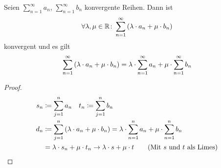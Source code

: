 \begin{satz} %
    Seien $\sum_{n=1}^{\infty} a_n$, $\sum_{n=1}^{\infty} b_n$ konvergente Reihen. Dann ist
    \begin{align*}
        \forall\lambda, \mu \in\mathbb{R}\colon \sum_{n=1}^{\infty} \left(\lambda\cdot a_n + \mu\cdot b_n\right)
    \end{align*}
    konvergent und es gilt
    \begin{align*}
        \sum_{n=1}^{\infty} \left(\lambda\cdot a_n + \mu\cdot b_n\right) = \lambda \cdot \sum_{n=1}^{\infty} a_n + \mu\cdot \sum_{n=1}^{\infty} b_n
    \end{align*}
    \begin{proof}
        \begin{align*}
            s_n &\coloneqq \sum_{j=1}^{n} a_n \quad t_n \coloneqq \sum_{j=1}^{n} b_n\\
            d_n &\coloneqq \sum_{j=1}^{n} \left(\lambda\cdot a_n + \mu\cdot b_n\right) =   \lambda \cdot \sum_{n=1}^{n} a_n + \mu\cdot \sum_{n=1}^{n} b_n\\
            &= \lambda\cdot s_n + \mu\cdot t_n \rightarrow{} \lambda\cdot s + \mu\cdot t\tag{Mit $s$ und $t$ als Limes}
        \end{align*}
    \end{proof}
\end{satz}

